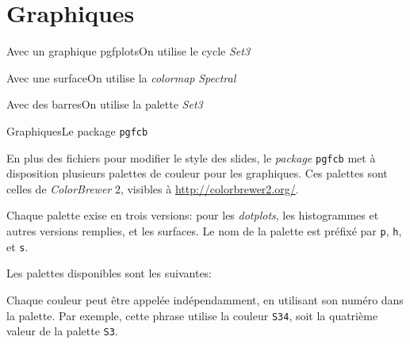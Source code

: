 \documentclass{eecslides}
\begin{document}
	\section{Graphiques}

	\begin{frame}{Avec un graphique pgfplots}{On utilise le cycle \emph{Set3}}
		\begin{center}
			
		\end{center}	
	\end{frame}

	\begin{frame}{Avec une surface}{On utilise la \emph{colormap} \emph{Spectral}}
		\begin{center}
			
		\end{center}	
	\end{frame}

	\begin{frame}{Avec des barres}{On utilise la palette \emph{Set3}}
		\begin{center}
			
		\end{center}	
	\end{frame}

	\begin{frame}[allowframebreaks]{Graphiques}{Le package \texttt{pgfcb}}
	    
		En plus des fichiers pour modifier le style des slides, le \emph{package} \texttt{pgfcb} met à disposition plusieurs palettes de couleur pour les graphiques. Ces palettes sont celles de \emph{ColorBrewer} 2, visibles à \url{http://colorbrewer2.org/}.

		\framebreak

		Chaque palette exise en trois versions: pour les \emph{dotplots}, les histogrammes et autres versions remplies, et les surfaces. Le nom de la palette est préfixé par \texttt{p}, \texttt{h}, et \texttt{s}.

		\framebreak

		Les palettes disponibles sont les suivantes:

		\framebreak

		Chaque \alert{couleur} peut être appelée indépendamment, en utilisant son numéro dans la palette. Par exemple, cette phrase {\color{S34} utilise la couleur \texttt{S34}}, soit la quatrième valeur de la palette \texttt{S3}. 


	\end{frame}
\end{document}
